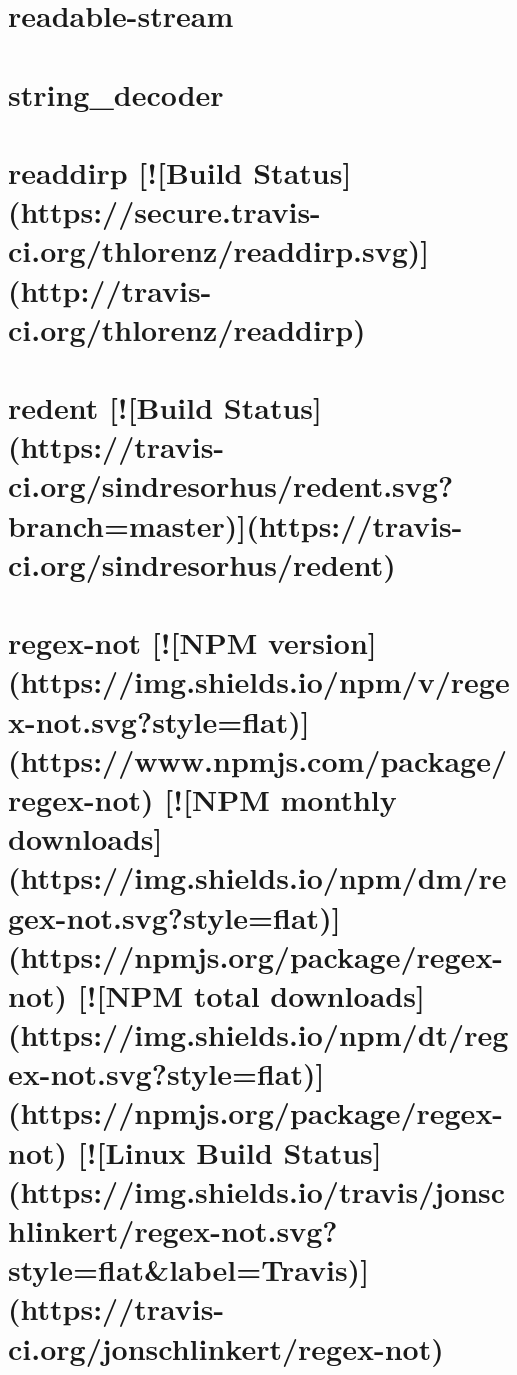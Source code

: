 \documentclass[twoside]{book}
\newcommand{\+}{\discretionary{\mbox{\scriptsize$\hookleftarrow$}}{}{}}
\begin{document}
\chapter{readable-\/stream}
\label{md_dsmacc_vis_degree_node_modules_readdirp_node_modules_readable-stream_README}

\chapter{string\+\_\+decoder}
\label{md_dsmacc_vis_degree_node_modules_readdirp_node_modules_string_decoder_README}

\chapter{readdirp \mbox{[}!\mbox{[}Build Status\mbox{]}(https\+://secure.travis-\/ci.org/thlorenz/readdirp.svg)\mbox{]}(http\+://travis-\/ci.org/thlorenz/readdirp)}
\label{md_dsmacc_vis_degree_node_modules_readdirp_README}

\chapter{redent \mbox{[}!\mbox{[}Build Status\mbox{]}(https\+://travis-\/ci.org/sindresorhus/redent.svg?branch=master)\mbox{]}(https\+://travis-\/ci.org/sindresorhus/redent)}
\label{md_dsmacc_vis_degree_node_modules_redent_readme}

\chapter{regex-\/not \mbox{[}!\mbox{[}N\+PM version\mbox{]}(https\+://img.shields.\+io/npm/v/regex-\/not.svg?style=flat)\mbox{]}(https\+://www.npmjs.\+com/package/regex-\/not) \mbox{[}!\mbox{[}N\+PM monthly downloads\mbox{]}(https\+://img.shields.\+io/npm/dm/regex-\/not.svg?style=flat)\mbox{]}(https\+://npmjs.org/package/regex-\/not) \mbox{[}!\mbox{[}N\+PM total downloads\mbox{]}(https\+://img.shields.\+io/npm/dt/regex-\/not.svg?style=flat)\mbox{]}(https\+://npmjs.org/package/regex-\/not) \mbox{[}!\mbox{[}Linux Build Status\mbox{]}(https\+://img.shields.\+io/travis/jonschlinkert/regex-\/not.svg?style=flat\&label=Travis)\mbox{]}(https\+://travis-\/ci.org/jonschlinkert/regex-\/not)}
\label{md_dsmacc_vis_degree_node_modules_regex-not_README}

\end{document}
